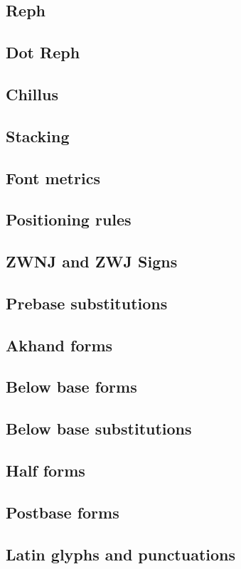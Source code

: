 \subsection {Reph}
\subsection {Dot Reph}
\subsection {Chillus}
\subsection {Stacking}
\subsection {Font metrics} 
\subsection {Positioning rules} 
\subsection {ZWNJ and ZWJ Signs}
\subsection {Prebase substitutions}
\subsection {Akhand forms}
\subsection {Below base forms}
\subsection {Below base substitutions}
\subsection {Half forms}
\subsection {Postbase forms}
\subsection {Latin glyphs and punctuations}
